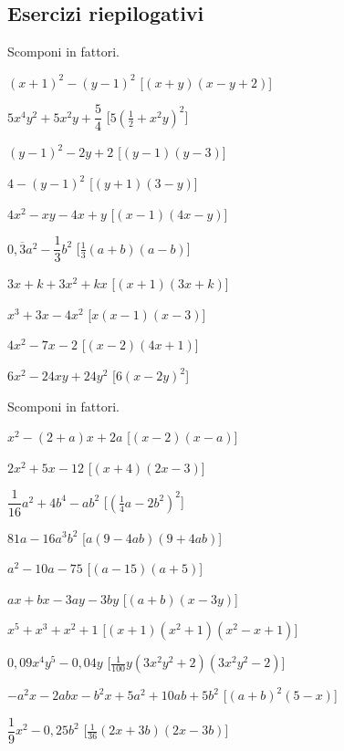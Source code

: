 \subsection{Esercizi riepilogativi}

\begin{esercizio}[\Ast]
 \label{ese:17.19}
 Scomponi in fattori.
 \begin{multicols}{2}
 \begin{enumeratea}
 \item $(x+1)^{2}-(y-1)^{2}$ \hfill [$(x+y)\left(x-y+2\right)$]
\item $5x^{4}y^{2}+5x^{2}y+\dfrac{5}{4}$ 
 \hfill [$5\left(\frac{1}{2}+x^{2}y\right)^{2}$]
\item $(y-1)^{2}-2y+2$ \hfill [$(y-1)\left(y-3\right)$]
\item $4-(y-1)^{2}$ \hfill [$(y+1)\left(3-y\right)$]
\item $4x^{2}-xy-4x+y$ \hfill [$(x-1)\left(4x-y\right)$]
\item $0,\overline{{3}}a^{2}-\dfrac{1}{3}b^{2}$ 
 \hfill [$\frac{1}{3}(a+b)\left(a-b\right)$]
\item $3x+k+3x^{2}+kx$ \hfill [$(x+1)\left(3x+k\right)$]
\item $x^{3}+3x-4x^{2}$ \hfill [$x(x-1)\left(x-3\right)$]
\item $4x^{2}-7x-2$ \hfill [$(x-2)\left(4x+1\right)$]
\item $6x^{2}-24xy+24y^{2}$ \hfill [$6\left(x-2y\right)^{2}$]
 \end{enumeratea}
 \end{multicols}
\end{esercizio}

\begin{esercizio}[\Ast]
 \label{ese:17.20}
 Scomponi in fattori.
 \begin{enumeratea}
\item $x^{2}-(2+a)x+2a$
  \hfill [$(x-2)\left(x-a\right)$]
\item $2x^{2}+5x-12$
  \hfill [$(x+4)\left(2x-3\right)$]
\item $\dfrac{1}{16}a^{2}+4b^{4}-ab^{2}$
  \hfill [$\left(\frac{1}{4}a-2b^{2}\right)^{2}$]
\item $81a-16a^{3}b^{2}$
  \hfill [$a(9-4{ab})(9+4{ab})$]
\item $a^{2}-10a-75$
  \hfill [$(a-15)(a+5)$]
\item $ax+bx-3ay-3by$
  \hfill [$(a+b)(x-3y)$]
\item $x^{5}+x^{3}+x^{2}+1$
  \hfill [$(x+1)\left(x^{2}+1\right)\left(x^{2}-x+1\right)$]
\item $0,09x^{4}y^{5}-0,04y$
  \hfill [$\frac{1}{100}y\left(3x^{2}y^{2}+2\right)\left(3x^{2}y^{2}-2\right)$]
\item $-a^{2}x-2{abx}-b^{2}x+5a^{2}+10{ab}+5b^{2}$
  \hfill [$(a+b)^{2}\left(5-x\right)$]
\item $\dfrac{1}{9}x^{2}-0,25b^{2}$
  \hfill [$\frac{1}{36}(2x+3b)\left(2x-3b\right)$]
 \end{enumeratea}
\end{esercizio}

